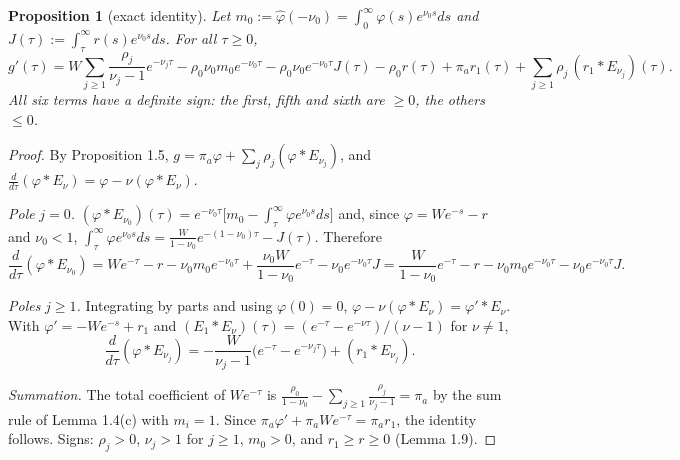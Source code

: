 \documentclass[11pt,a4paper]{article}
\newtheorem{proposition}[theorem]{Proposition}
\theoremstyle{definition}
\theoremstyle{remark}
\begin{document}
\begin{proposition}[{exact identity}]
Let $m_0:=\hat\varphi(-\nu_0)=\int_0^\infty\varphi(s)e^{\nu_0s}ds$ and $J(\tau):=\int_\tau^\infty r(s)e^{\nu_0s}ds$. For all $\tau\ge0$,
\begin{equation*}
g'(\tau)=W\sum_{j\ge1}\frac{\rho_j}{\nu_j-1}e^{-\nu_j\tau}-\rho_0\nu_0m_0e^{-\nu_0\tau}-\rho_0\nu_0e^{-\nu_0\tau}J(\tau)-\rho_0r(\tau)+\pi_ar_1(\tau)+\sum_{j\ge1}\rho_j\,(r_1*E_{\nu_j})(\tau).
\end{equation*}
All six terms have a definite sign: the first, fifth and sixth are $\ge0$, the others $\le0$.
\end{proposition}

\begin{proof}
By Proposition 1.5, $g=\pi_a\varphi+\sum_j\rho_j(\varphi*E_{\nu_j})$, and $\frac{d}{d\tau}(\varphi*E_\nu)=\varphi-\nu(\varphi*E_\nu)$.

\emph{Pole} $j=0$\emph{.} $(\varphi*E_{\nu_0})(\tau)=e^{-\nu_0\tau}\bigl[m_0-\int_\tau^\infty\varphi e^{\nu_0s}ds\bigr]$ and, since $\varphi=We^{-s}-r$ and $\nu_0<1$, $\int_\tau^\infty\varphi e^{\nu_0s}ds=\frac{W}{1-\nu_0}e^{-(1-\nu_0)\tau}-J(\tau)$. Therefore
\begin{equation*}
\frac{d}{d\tau}(\varphi*E_{\nu_0})=We^{-\tau}-r-\nu_0m_0e^{-\nu_0\tau}+\frac{\nu_0W}{1-\nu_0}e^{-\tau}-\nu_0e^{-\nu_0\tau}J=\frac{W}{1-\nu_0}e^{-\tau}-r-\nu_0m_0e^{-\nu_0\tau}-\nu_0e^{-\nu_0\tau}J .
\end{equation*}

\emph{Poles} $j\ge1$\emph{.} Integrating by parts and using $\varphi(0)=0$, $\varphi-\nu(\varphi*E_\nu)=\varphi'*E_\nu$. With $\varphi'=-We^{-s}+r_1$ and $(E_1*E_\nu)(\tau)=(e^{-\tau}-e^{-\nu\tau})/(\nu-1)$ for $\nu\ne1$,
\begin{equation*}
\frac{d}{d\tau}(\varphi*E_{\nu_j})=-\frac{W}{\nu_j-1}\bigl(e^{-\tau}-e^{-\nu_j\tau}\bigr)+(r_1*E_{\nu_j}).
\end{equation*}

\emph{Summation.} The total coefficient of $We^{-\tau}$ is $\frac{\rho_0}{1-\nu_0}-\sum_{j\ge1}\frac{\rho_j}{\nu_j-1}=\pi_a$ by the sum rule of Lemma 1.4(c) with $m_i=1$. Since $\pi_a\varphi'+\pi_aWe^{-\tau}=\pi_ar_1$, the identity follows. Signs: $\rho_j>0$, $\nu_j>1$ for $j\ge1$, $m_0>0$, and $r_1\ge r\ge0$ (Lemma 1.9).
\end{proof}
\end{document}
